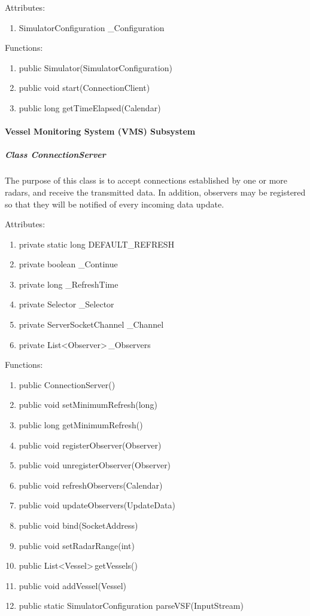 \documentclass{article}
\begin{document}
\vspace{0.5cm}
Attributes:
\begin{enumerate}
	\item SimulatorConfiguration \_Configuration
\end {enumerate}

\vspace{0.5cm}
Functions:
\begin{enumerate}
	\item public Simulator(SimulatorConfiguration)
	\item public void start(ConnectionClient)
	\item public long getTimeElapsed(Calendar)
\end{enumerate}

\paragraph{Vessel Monitoring System (VMS) Subsystem}

\subparagraph{Class ConnectionServer}
The purpose of this class is to accept connections established by one or more radars, and receive the transmitted data. In addition, observers may be registered so that they will be notified of every incoming data update.

\vspace{0.5cm}
Attributes:
\begin{enumerate}
	\item private static long DEFAULT\_REFRESH
    \item private boolean \_Continue
    \item private long \_RefreshTime
    \item private Selector \_Selector
    \item private ServerSocketChannel \_Channel
    \item private List\textless Observer\textgreater \,\_Observers
\end {enumerate}

\vspace{0.5cm}
Functions:
\begin{enumerate}
	\item public ConnectionServer()
	\item public void setMinimumRefresh(long)
	\item public long getMinimumRefresh()
	\item public void registerObserver(Observer)
	\item public void unregisterObserver(Observer)
	\item public void refreshObservers(Calendar)
	\item public void updateObservers(UpdateData)
	\item public void bind(SocketAddress)
	\item public void setRadarRange(int)
	\item public List\textless Vessel\textgreater \,getVessels()
	\item public void addVessel(Vessel)
	\item public static SimulatorConfiguration parseVSF(InputStream)
\end{enumerate}
\end{document}
